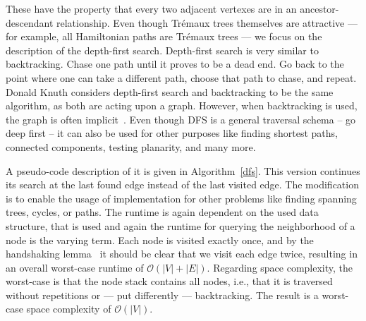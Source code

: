                 These have the property that every two adjacent vertexes are in an ancestor-descendant relationship.
                Even though Trémaux trees themselves are attractive --- for example, all Hamiltonian paths are Trémaux trees --- we focus on the description of the depth-first search.        
                Depth-first search is very similar to backtracking. Chase one path until it proves to be a dead end. 
                Go back to the point where one can take a different path, choose that path to chase, and repeat. 
                Donald Knuth considers depth-first search and backtracking to be the same algorithm, as both are acting upon a graph. 
                However, when backtracking is used, the graph is often implicit~\autocite{Knuth2000DancingL}.        
                Even though DFS is a general traversal schema -- go deep first -- it can also be used for other purposes like finding shortest paths, connected components, testing planarity, and many more. 
                        

                A pseudo-code description of it is given in Algorithm~\ref{dfs}. 
                This version continues its search at the last found edge instead of the last visited edge. 
                The modification is to enable the usage of implementation for other problems like finding spanning trees, cycles, or paths.
                The runtime is again dependent on the used data structure, that is used and again the runtime for querying the neighborhood of a node is the varying term. 
                Each node is visited exactly once, and by the handshaking lemma~\autocite{Gross1998GraphTA} it should be clear that we visit each edge twice, resulting in an overall worst-case runtime of $\mathcal{O}(|V|+|E|)$. 
                Regarding space complexity, the worst-case is that the node stack contains all nodes, i.e., that it is traversed without repetitions or --- put differently --- backtracking. 
                The result is a worst-case space complexity of $\mathcal{O}(|V|)$.
            
